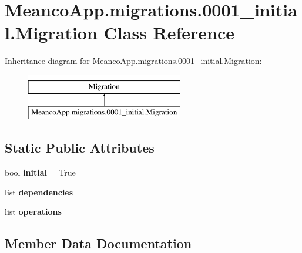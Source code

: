 \hypertarget{class_meanco_app_1_1migrations_1_10001__initial_1_1_migration}{}\section{Meanco\+App.\+migrations.0001\+\_\+initial.Migration Class Reference}
\label{class_meanco_app_1_1migrations_1_10001__initial_1_1_migration}
Inheritance diagram for Meanco\+App.\+migrations.0001\+\_\+initial.Migration\+:\begin{figure}[H]
\begin{center}
\leavevmode
\includegraphics[height=2.000000cm]{class_meanco_app_1_1migrations_1_10001__initial_1_1_migration}
\end{center}
\end{figure}
\subsection*{Static Public Attributes}
\begin{DoxyCompactItemize}
\item 
\hypertarget{class_meanco_app_1_1migrations_1_10001__initial_1_1_migration_a74956a2193f51958c6130066354430d8}{}\label{class_meanco_app_1_1migrations_1_10001__initial_1_1_migration_a74956a2193f51958c6130066354430d8} 
bool {\bfseries initial} = True
\item 
list {\bfseries dependencies}
\item 
\hypertarget{class_meanco_app_1_1migrations_1_10001__initial_1_1_migration_a51bfbbc35771e66234b980471670182e}{}\label{class_meanco_app_1_1migrations_1_10001__initial_1_1_migration_a51bfbbc35771e66234b980471670182e} 
list {\bfseries operations}
\end{DoxyCompactItemize}


\subsection{Member Data Documentation}
\hypertarget{class_meanco_app_1_1migrations_1_10001__initial_1_1_migration_a4388e846b78a9425643163ee110c8faf}{}\label{class_meanco_app_1_1migrations_1_10001__initial_1_1_migration_a4388e846b78a9425643163ee110c8faf} 
